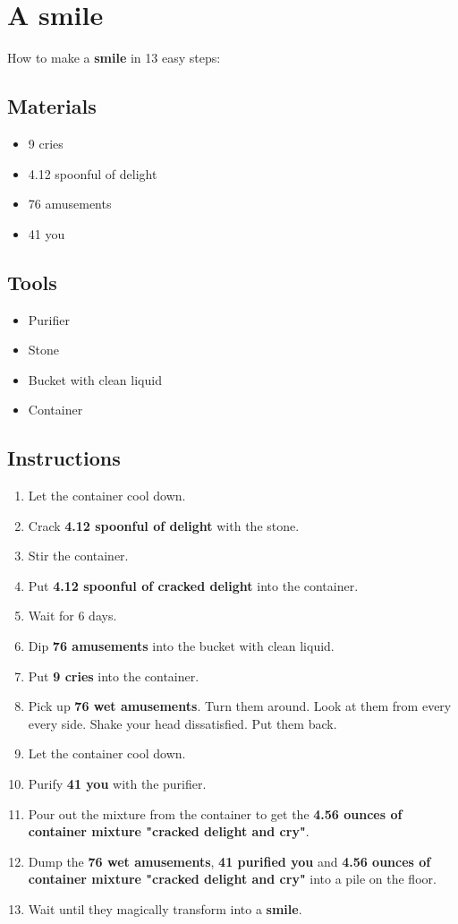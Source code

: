 \documentclass{article}
\begin{document}
\section{A smile}How to make a \textbf{smile} in 13 easy steps:

\subsection{Materials}\begin{itemize}
\item 
9 cries
\item 
4.12 spoonful of delight
\item 
76 amusements
\item 
41 you
\end{itemize}
\subsection{Tools}\begin{itemize}
\item 
Purifier
\item 
Stone
\item 
Bucket with clean liquid
\item 
Container
\end{itemize}
\subsection{Instructions}\begin{enumerate}
\item 
Let the container cool down.
\item 
Crack \textbf{4.12 spoonful of delight} with the stone.
\item 
Stir the container.
\item 
Put \textbf{4.12 spoonful of cracked delight} into the container.
\item 
Wait for 6 days.
\item 
Dip \textbf{76 amusements} into the bucket with clean liquid.
\item 
Put \textbf{9 cries} into the container.
\item 
Pick up \textbf{76 wet amusements}. Turn them around. Look at them from every every side. Shake your head dissatisfied. Put them back.
\item 
Let the container cool down.
\item 
Purify \textbf{41 you} with the purifier.
\item 
Pour out the mixture from the container to get the \textbf{4.56 ounces of container mixture "cracked delight and cry"}.
\item 
Dump the \textbf{76 wet amusements}, \textbf{41 purified you} and \textbf{4.56 ounces of container mixture "cracked delight and cry"} into a pile on the floor.
\item 
Wait until they magically transform into a \textbf{smile}.
\end{enumerate}
\newpage
\end{document}
